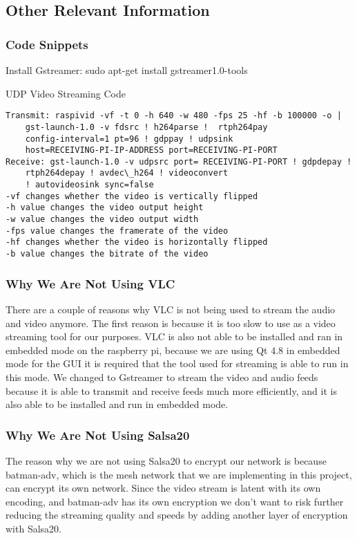 \documentclass[onecolumn, draftclsnofoot,10pt, compsoc]{IEEEtran}
\newcommand\tab[1][1cm]{\hspace*{#1}}
\begin{document}
	


\subsection{Other Relevant Information}
\subsubsection{Code Snippets}
Install Gstreamer: \newline
\tab \tab sudo apt-get install gstreamer1.0-tools

UDP Video Streaming Code 

\begin{lstlisting}
Transmit: raspivid -vf -t 0 -h 640 -w 480 -fps 25 -hf -b 100000 -o |	 
	gst-launch-1.0 -v fdsrc ! h264parse !  rtph264pay 
	config-interval=1 pt=96 ! gdppay ! udpsink 
	host=RECEIVING-PI-IP-ADDRESS port=RECEIVING-PI-PORT
Receive: gst-launch-1.0 -v udpsrc port= RECEIVING-PI-PORT ! gdpdepay ! 
	rtph264depay ! avdec\_h264 ! videoconvert 
	! autovideosink sync=false
-vf changes whether the video is vertically flipped
-h value changes the video output height
-w value changes the video output width
-fps value changes the framerate of the video
-hf changes whether the video is horizontally flipped
-b value changes the bitrate of the video 
\end{lstlisting}
\subsubsection{Why We Are Not Using VLC}
	There are a couple of reasons why VLC is not being used to stream the audio and video anymore. The first reason is because it is too slow to use as a video streaming tool for our purposes. VLC is also not able to be installed and ran in embedded mode on the raspberry pi, because we are using Qt 4.8 in embedded mode for the GUI it is required that the tool used for streaming is able to run in this mode. We changed to Gstreamer to stream the video and audio feeds because it is able to transmit and receive feeds much more efficiently, and it is also able to be installed and run in embedded mode.
	
\subsubsection{Why We Are Not Using Salsa20}
	The reason why we are not using Salsa20 to encrypt our network is because batman-adv, which is the mesh network that we are implementing in this project, can encrypt its own network. Since the video stream is latent with its own encoding, and batman-adv has its own encryption we don’t want to risk further reducing the streaming quality and speeds by adding another layer of encryption with Salsa20.
\end{document}

